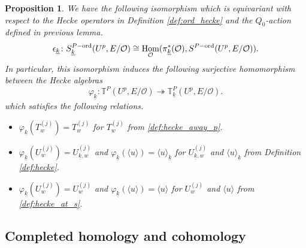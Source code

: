 \documentclass[leqno]{amsart}
\newtheorem{prop}[thm]{Proposition}
\theoremstyle{definition}
\theoremstyle{remark}
\newcommand{\oo}{\mathcal{O}}
\DeclareMathOperator{\Hom}{Hom}
\newcommand{\wt}[1]{\underline{ #1 }}
\newcommand{\TT}{\mathbb{T}} %
\newcommand{\ord}{\textnormal{ord}} %
\begin{document}
\begin{prop}\label{prop:wt_indep}
	We have the following isomorphism
	which is equivariant with respect to the 
	Hecke operators in Definition \ref{def:ord_hecke}
    and the $Q_0$-action  defined in previous lemma.
	\[
		\epsilon_{\wt{k}} \colon 
		S_{\wt{k}}^{P-\ord}(U^p,E/\oo)\cong 
		\Hom_{\oo}(\pi_{\wt{k}}^*(\oo),
		S^{P-\ord}(U^p,E/\oo)).
	\]
	In particular, this isomorphism 
	induces the following surjective homomorphism
	between the Hecke algebras
	\[
		\varphi_{\wt{k}}\colon 
		\TT^P(U^p,E/\oo)\twoheadrightarrow
		\TT^P_{\wt{k}}(U^p,E/\oo).
	\]
    which satisfies the following relations.
    \begin{itemize}
    \item $\varphi_{\wt{k}}(T_w^{(j)})=T_w^{(j)}$ for $T_w^{(j)}$
    from \eqref{def:hecke_away_p}.
    \item $\varphi_{\wt{k}}(U_{w}^{(j)})=U_{\wt{k},w}^{(j)}$ 
    and  $\varphi_{\wt{k}}(\langle u\rangle)=
    \langle u\rangle_{\wt{k}}$ 
    for $U_{\wt{k},w}^{(j)}$ and $\langle u\rangle_{\wt{k}}$
    from Definition \eqref{def:hecke}.
    \item $\varphi_{\wt{k}}(U_{w}^{(j)})=U_{w}^{(j)}$ 
    and  $\varphi_{\wt{k}}(\langle u\rangle)=
    \langle u\rangle$  
    for $U_{w}^{(j)}$ and $\langle u\rangle$
    from \eqref{def:hecke_at_s}.
    \end{itemize}
\end{prop}


\subsection{Completed homology and cohomology}
\end{document}
